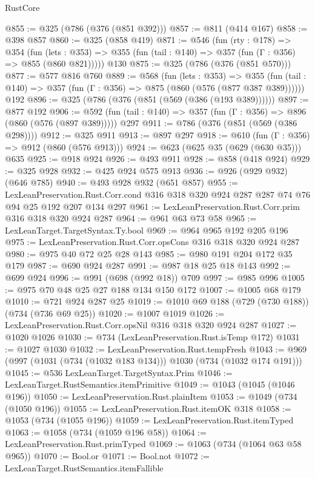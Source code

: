 \begin{lexlean}{RustCore}
\begin{coremodule}
@855 := @325 (@786 (@376 (@851 @392)))
@857 := @811 (@414 @167)
@858 := @398 @857
@860 := @325 (@858 @419)
@871 := @546
    (fun (rty : @178) =>
    @354
      (fun (lets : @353) => @355 (fun (tail : @140) => @357 (fun (Γ : @356) => @855 (@860 @821)))))
    @130
@875 := @325 (@786 (@376 (@851 @570)))
@877 := @577 @816 @760
@889 := @568
    (fun (lets : @353) =>
    @355 (fun (tail : @140) => @357 (fun (Γ : @356) => @875 (@860 (@576 (@877 @387 @389))))))
    @192
@896 := @325 (@786 (@376 (@851 (@569 (@386 (@193 @389))))))
@897 := @877 @192
@906 := @592 (fun (tail : @140) => @357 (fun (Γ : @356) => @896 (@860 (@576 (@897 @389))))) @297
@911 := @786 (@376 (@851 (@569 (@386 @298))))
@912 := @325 @911
@913 := @897 @297
@918 := @610 (fun (Γ : @356) => @912 (@860 (@576 @913)))
@924 := @623 (@625 @35 (@629 (@630 @35))) @635
@925 := @918 @924
@926 := @493 @911
@928 := @858 (@418 @924)
@929 := @325 @928
@932 := @425 @924 @575 @913
@936 := @926 (@929 @932) (@646 @785)
@940 := @493 @928 @932 (@651 @857)
@955 := LexLeanPreservation.Rust.Corr.cond
    @316
    @318
    @320
    @924
    @287
    @287
    @74
    @76
    @94
    @25
    @192
    @207
    @134
    @297
@961 := LexLeanPreservation.Rust.Corr.prim @316 @318 @320 @924 @287
@964 := @961 @63 @73 @58
@965 := LexLeanTarget.TargetSyntax.Ty.bool
@969 := @964 @965 @192 @205 @196
@975 := LexLeanPreservation.Rust.Corr.opsCons @316 @318 @320 @924 @287
@980 := @975 @40 @72 @25 @28 @143
@985 := @980 @191 @204 @172 @35 @179
@987 := @690 @924 @287
@991 := @987 @18 @25 @18 @143
@992 := @699 @924
@996 := @991 (@698 (@992 @18)) @709
@997 := @985 @996
@1005 := @975 @70 @48 @25 @27 @188 @134 @150 @172
@1007 := @1005 @68 @179
@1010 := @721 @924 @287 @25
@1019 := @1010 @69 @188 (@729 (@730 @188)) (@734 (@736 @69 @25))
@1020 := @1007 @1019
@1026 := LexLeanPreservation.Rust.Corr.opsNil @316 @318 @320 @924 @287
@1027 := @1020 @1026
@1030 := @734 (LexLeanPreservation.Rust.isTemp @172)
@1031 := @1027 @1030
@1032 := LexLeanPreservation.Rust.tempFresh
@1043 := @969 (@997 (@1031 (@734 (@1032 @183 @134))) @1030 (@734 (@1032 @174 @191)))
@1045 := @536 LexLeanTarget.TargetSyntax.Prim
@1046 := LexLeanTarget.RustSemantics.itemPrimitive
@1049 := @1043 (@1045 (@1046 @196))
@1050 := LexLeanPreservation.Rust.plainItem
@1053 := @1049 (@734 (@1050 @196))
@1055 := LexLeanPreservation.Rust.itemOK @318
@1058 := @1053 (@734 (@1055 @196))
@1059 := LexLeanPreservation.Rust.itemTyped
@1063 := @1058 (@734 (@1059 @196 @58))
@1064 := LexLeanPreservation.Rust.primTyped
@1069 := @1063 (@734 (@1064 @63 @58 @965))
@1070 := Bool.or
@1071 := Bool.not
@1072 := LexLeanTarget.RustSemantics.itemFallible

\end{coremodule}
\end{lexlean}
